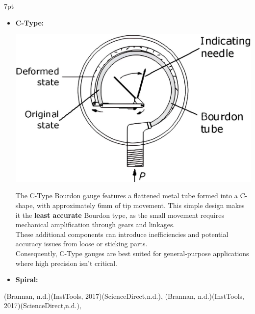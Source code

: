 \documentclass{article}
\newcommand{\formalsource}{} %
\newenvironment{formal}[3][]{%
	\renewcommand{\formalsource}{#1}%
	\def\FrameCommand{%
		\hspace{1pt}%
		{\color{#2}\vrule width 2pt}%
		{\color{#3}\vrule width 4pt}%
		\colorbox{#3}%
	}%
	\MakeFramed{\advance\hsize-\width\FrameRestore}%
	\noindent\hspace{-4.55pt}%
	\begin{adjustwidth}{}{7pt}%
		\vspace{2pt}%
	}%
	{%
		\vspace{4pt}%
		\ifx\formalsource\empty %
		\else
		\hfill{\footnotesize{\formalsource}}%
		\fi
	\end{adjustwidth}\endMakeFramed%
}
\begin{document}
\begin{formal}[(Brannan, n.d.)(InstTools, 2017)(ScienceDirect,n.d.), ]{black!50!white}{white}
\begin{itemize}
	\item \textbf{C-Type:}\\[8pt]
	\begin{minipage}{0.3\textwidth}\centering\hspace*{-1em}
		\includegraphics[width=1.1\textwidth]{images/ezgif-42a6b97cab4453(2)}
	\end{minipage}\hfill
	\begin{minipage}{0.6\textwidth}
		The C-Type Bourdon gauge features a flattened metal tube formed into a C-shape, with approximately 6mm of tip movement. This simple design makes it the \textbf{least accurate} Bourdon type, as the small movement requires mechanical amplification through gears and linkages.\\[5pt]
		These additional components can introduce inefficiencies and potential accuracy issues from loose or sticking parts.\\[5pt]
		Consequently, C-Type gauges are best suited for general-purpose applications where high precision isn't critical.
	\end{minipage}
   \item \textbf{Spiral:}\\[8pt]
	\begin{minipage}{0.3\textwidth}\centering

\end{minipage}
\end{itemize}
\end{formal}
\end{document}
